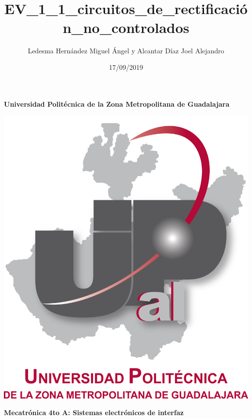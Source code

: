\documentclass[letterpaper]{article}
\title{EV\_1\_1\_circuitos\_de\_rectificación\_no\_controlados}
\author{Ledesma Hernández Miguel Ángel y Alcantar Díaz Joel Alejandro}
\date{17/09/2019}
\begin{document}
{\maketitle}






\vspace{6cm}
\begin{center}
    \textbf{Universidad Politécnica  de la Zona Metropolitana de Guadalajara}\\

\end{center}



\vspace{.3cm}
\begin{center}
\centering
\includegraphics[scale=0.3]{UPZMGLog.png}\\
\vspace{1cm}

    \textbf{Mecatr\'onica 4to A: Sistemas electr\'onicos de interfaz}

\end{center}
\end{document}
